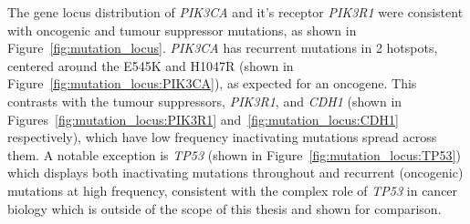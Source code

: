 The gene locus distribution of \textit{PIK3CA} and it's receptor \textit{PIK3R1} were consistent with oncogenic and tumour suppressor mutations, as shown in Figure~\ref{fig:mutation_locus}. \textit{PIK3CA} has recurrent mutations in 2 hotspots, centered around the E545K and H1047R (shown in Figure~\ref{fig:mutation_locus:PIK3CA}), as expected for an oncogene. This contrasts with the tumour suppressors, \textit{PIK3R1}, and \textit{CDH1} (shown in Figures~\ref{fig:mutation_locus:PIK3R1} and~\ref{fig:mutation_locus:CDH1} respectively), which have low frequency inactivating mutations spread across them. A notable exception is \textit{TP53} (shown in Figure~\ref{fig:mutation_locus:TP53}) which displays both inactivating mutations throughout and recurrent (oncogenic) mutations at high frequency, consistent with the complex role of \textit{TP53} in cancer biology which is outside of the scope of this thesis and shown for comparison. 


